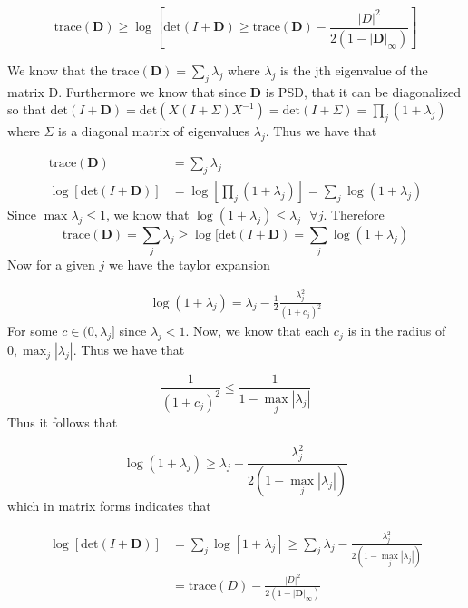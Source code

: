 \documentclass[answers]{exam} %
\newcommand{\B}[1]{\mathbf{#1}}
\begin{document}
\[
\mbox{trace}(\B{D}) \geq \log[ \mbox{det}(I + \B{D}) \geq \mbox{trace}(\B{D}) - \frac{|D|^2}{2( 1 - |\B{D}|_{\infty})}]
\]
\begin{framed}
We know that the $\mbox{trace}(\B{D}) = \sum_{j} \lambda_j$ where $\lambda_j$ is the jth eigenvalue of the matrix D. Furthermore we know that since $\B{D}$ is PSD, that it can be diagonalized so that $ \mbox{det}(I + \B{D}) =  \mbox{det}(X( I + \Sigma) X^{-1}) =\mbox{det}(I + \Sigma) = \prod_{j} (1 + \lambda_j)$ where $\Sigma $ is a diagonal matrix of eigenvalues $\lambda_j$. Thus we have that 

\begin{equation*}
\begin{aligned}
\mbox{trace}(\B{D}) &= \sum_j \lambda_j \\ 
\log[ \mbox{det} (I + \B{D}) ] &= \log[\prod_{j} ( 1 + \lambda_j)] = \sum_{j} \log( 1 + \lambda_j)
\end{aligned}
\end{equation*}
Since $\max \lambda_j \leq 1$, we know that $ \log( 1 + \lambda_j) \leq \lambda_j \mbox{ } \forall j$. Therefore
\[
\mbox{trace}(\B{D}) = \sum_j \lambda_j \geq  \log[ \mbox{det}(I + \B{D}) = \sum_{j} \log( 1 + \lambda_j)
\]
Now for a given $j$ we have the taylor expansion

\begin{equation*}
\begin{aligned}
\log(1 + \lambda_j) = \lambda_j - \frac{1}{2}\frac{\lambda_j^2}{(1 +c_j)^2}
\end{aligned}
\end{equation*}
For some $c \in (0, \lambda_j]$ since $\lambda_j < 1$. Now, we know that each $c_j$ is in the radius of $0, \max_{j} |\lambda_j|$. Thus we have that 

\[
\frac{1}{(1 + c_j)^2} \leq \frac{1}{ 1 - \max_{j} |\lambda_j|}
\]
Thus it follows that 

\[
\log(1 + \lambda_j) \geq \lambda_j - \frac{\lambda_j^2}{ 2( 1 - \max_{j} |\lambda_j| )}
\]
which in matrix forms indicates that 

\begin{equation*}
\begin{aligned}
\log[ \mbox{det}(I + \B{D})] &= \sum_j \log[ 1 + \lambda_j] \geq \sum_{j } \lambda_j - \frac{\lambda_j^2}{ 2( 1 - \max_{j} |\lambda_j| )} \\ 
&= \mbox{trace}(D) - \frac{|D|^2}{2 (1 - |\B{D}|_{\infty})}
\end{aligned}
\end{equation*}

\end{framed}
\end{document}
